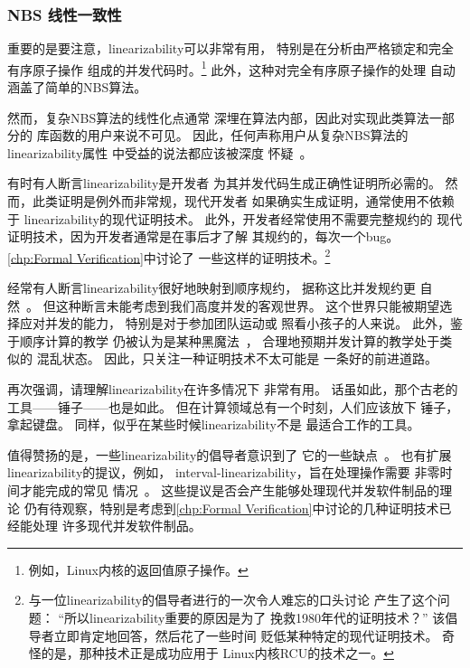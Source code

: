 \subsubsection{NBS 线性一致性}
\label{sec:advsync:NBS Linearizability}

重要的是要注意，linearizability可以非常有用，
特别是在分析由严格锁定和完全有序原子操作
组成的并发代码时。\footnote{
	例如，Linux内核的返回值原子操作。}
此外，这种对完全有序原子操作的处理
自动涵盖了简单的NBS算法。

然而，复杂NBS算法的线性化点通常
深埋在算法内部，因此对实现此类算法一部分的
库函数的用户来说不可见。
因此，任何声称用户从复杂NBS算法的linearizability属性
中受益的说法都应该被深度
怀疑~\cite{AndreasHaas2012FIFOisnt}。

有时有人断言linearizability是开发者
为其并发代码生成正确性证明所必需的。
然而，此类证明是例外而非常规，现代开发者
如果确实生成证明，通常使用不依赖于
linearizability的现代证明技术。
此外，开发者经常使用不需要完整规约的
现代证明技术，因为开发者通常是在事后才了解
其规约的，每次一个bug。
\cref{chp:Formal Verification}中讨论了
一些这样的证明技术。\footnote{
	与一位linearizability的倡导者进行的一次令人难忘的口头讨论
	产生了这个问题：
	``所以linearizability重要的原因是为了
	挽救1980年代的证明技术？''
	该倡导者立即肯定地回答，然后花了一些时间
	贬低某种特定的现代证明技术。
	奇怪的是，那种技术正是成功应用于
	Linux内核RCU的技术之一\@。}

经常有人断言linearizability很好地映射到顺序规约，
据称这比并发规约更
自然~\cite{SergioRajsbaum2020HistoryLinearizability}。
但这种断言未能考虑到我们高度并发的客观世界。
这个世界只能被期望选择应对并发的能力，
特别是对于参加团队运动或
照看小孩子的人来说。
此外，鉴于顺序计算的教学
仍被认为是某种黑魔法~\cite{ElizabethPatitsas2020GradesNotBimodal}，
合理地预期并发计算的教学处于类似的
混乱状态。
因此，只关注一种证明技术不太可能是
一条好的前进道路。

再次强调，请理解linearizability在许多情况下
非常有用。
话虽如此，那个古老的工具——锤子——也是如此。
但在计算领域总有一个时刻，人们应该放下
锤子，拿起键盘。
同样，似乎在某些时候linearizability不是
最适合工作的工具。

值得赞扬的是，一些linearizability的倡导者意识到了
它的一些缺点~\cite{SergioRajsbaum2020HistoryLinearizability}。
也有扩展linearizability的提议，例如，
interval-linearizability，旨在处理操作需要
非零时间才能完成的常见
情况~\cite{10.1145/3266457}。
这些提议是否会产生能够处理现代并发软件制品的理论
仍有待观察，特别是考虑到\cref{chp:Formal
Verification}中讨论的几种证明技术已经能处理
许多现代并发软件制品。

